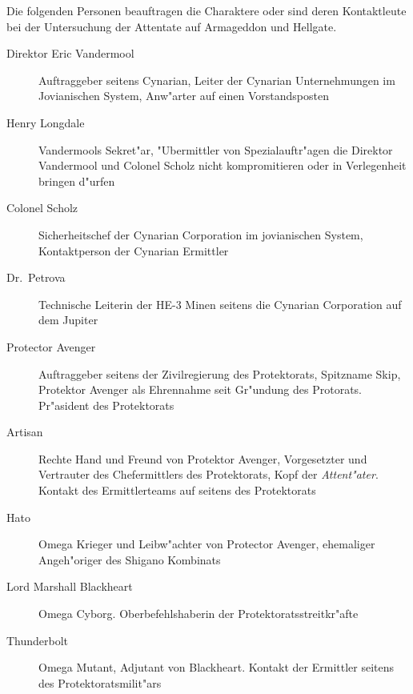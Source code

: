 
Die folgenden Personen beauftragen die Charaktere oder sind deren Kontaktleute bei der Untersuchung der Attentate auf 
Armageddon und Hellgate.


\begin{description}
    \item [Direktor Eric Vandermool] Auftraggeber seitens Cynarian, Leiter der Cynarian Unternehmungen im Jovianischen System,
        Anw"arter auf einen Vorstandsposten
    \item [Henry Longdale] Vandermools Sekret"ar, "Ubermittler von Spezialauftr"agen die Direktor Vandermool und Colonel Scholz
        nicht kompromitieren oder in Verlegenheit bringen d"urfen
    \item [Colonel Scholz] Sicherheitschef der Cynarian Corporation im jovianischen System, Kontaktperson der Cynarian Ermittler
    \item [Dr.~Petrova] Technische Leiterin der HE-3 Minen seitens die Cynarian Corporation auf dem Jupiter
\end{description}


\begin{description}
    \item [Protector Avenger] Auftraggeber seitens der Zivilregierung des Protektorats, Spitzname Skip, Protektor Avenger als Ehrennahme    
        seit Gr"undung des Protorats. Pr"asident des Protektorats    
    \item [Artisan] Rechte Hand und Freund von Protektor Avenger, Vorgesetzter und Vertrauter des Chefermittlers des Protektorats, Kopf der 
        \emph{Attent"ater}. Kontakt des Ermittlerteams auf seitens des Protektorats
    \item [Hato] Omega Krieger und Leibw"achter von Protector Avenger, ehemaliger Angeh"origer des Shigano Kombinats
    \item [Lord Marshall Blackheart] Omega Cyborg. Oberbefehlshaberin der Protektoratsstreitkr"afte
    \item [Thunderbolt] Omega Mutant, Adjutant von Blackheart. Kontakt der Ermittler seitens des Protektoratsmilit"ars
\end{description}
